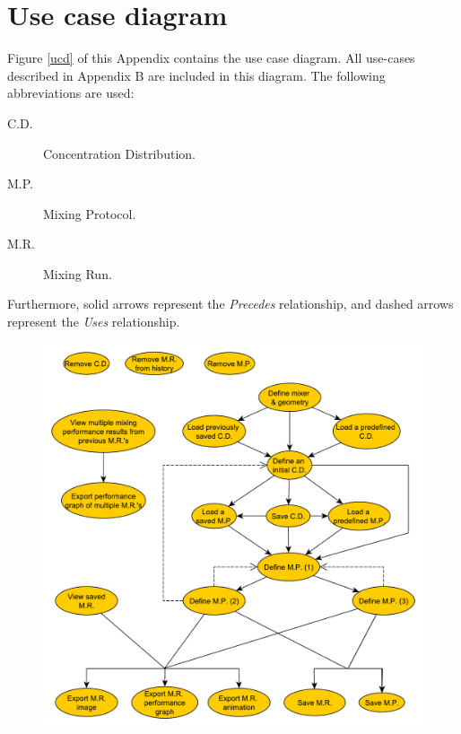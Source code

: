 \chapter{Use case diagram}

Figure \ref{ucd} of this Appendix contains the use case diagram. All use-cases described in Appendix B are included in this diagram. The following abbreviations are used:
\begin{description}
\item[C.D.] Concentration Distribution.
\item[M.P.] Mixing Protocol.
\item[M.R.] Mixing Run.
\end{description}

Furthermore, solid arrows represent the \emph{Precedes} relationship, and dashed arrows represent the \emph{Uses} relationship.

\begin{figure}[h!]
\begin{center}
\includegraphics[keepaspectratio=true,width=800 pt,height=508 pt]{UseCaseDiagram.pdf}
\end{center}
\end{figure}
